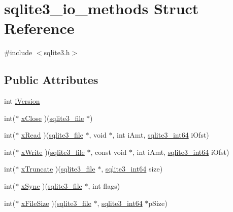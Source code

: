 \hypertarget{structsqlite3__io__methods}{}\section{sqlite3\+\_\+io\+\_\+methods Struct Reference}
\label{structsqlite3__io__methods}


{\ttfamily \#include $<$sqlite3.\+h$>$}

\subsection*{Public Attributes}
\begin{DoxyCompactItemize}
\item 
int \mbox{\hyperlink{structsqlite3__io__methods_ad1c72bdfde750a09a797f314a096a965}{i\+Version}}
\item 
int($\ast$ \mbox{\hyperlink{structsqlite3__io__methods_ae0673b03bfa033d59188bfdab418cd26}{x\+Close}} )(\mbox{\hyperlink{structsqlite3__file}{sqlite3\+\_\+file}} $\ast$)
\item 
int($\ast$ \mbox{\hyperlink{structsqlite3__io__methods_ac1433ffc0da0414a2a67a46d338d83eb}{x\+Read}} )(\mbox{\hyperlink{structsqlite3__file}{sqlite3\+\_\+file}} $\ast$, void $\ast$, int i\+Amt, \mbox{\hyperlink{sqlite3_8h_a0a4d3e6c1ad46f90e746b920ab6ca0d2}{sqlite3\+\_\+int64}} i\+Ofst)
\item 
int($\ast$ \mbox{\hyperlink{structsqlite3__io__methods_a659f6a40777b685c6a6b80e5f07a3328}{x\+Write}} )(\mbox{\hyperlink{structsqlite3__file}{sqlite3\+\_\+file}} $\ast$, const void $\ast$, int i\+Amt, \mbox{\hyperlink{sqlite3_8h_a0a4d3e6c1ad46f90e746b920ab6ca0d2}{sqlite3\+\_\+int64}} i\+Ofst)
\item 
int($\ast$ \mbox{\hyperlink{structsqlite3__io__methods_abe797948913bfe94d4fab7246773af50}{x\+Truncate}} )(\mbox{\hyperlink{structsqlite3__file}{sqlite3\+\_\+file}} $\ast$, \mbox{\hyperlink{sqlite3_8h_a0a4d3e6c1ad46f90e746b920ab6ca0d2}{sqlite3\+\_\+int64}} size)
\item 
int($\ast$ \mbox{\hyperlink{structsqlite3__io__methods_ad4b78f6b0b475e621fe29fb1cc886437}{x\+Sync}} )(\mbox{\hyperlink{structsqlite3__file}{sqlite3\+\_\+file}} $\ast$, int flags)
\item 
int($\ast$ \mbox{\hyperlink{structsqlite3__io__methods_ae875f158de72435f40ca0bd5207d9862}{x\+File\+Size}} )(\mbox{\hyperlink{structsqlite3__file}{sqlite3\+\_\+file}} $\ast$, \mbox{\hyperlink{sqlite3_8h_a0a4d3e6c1ad46f90e746b920ab6ca0d2}{sqlite3\+\_\+int64}} $\ast$p\+Size)

\end{DoxyCompactItemize}
